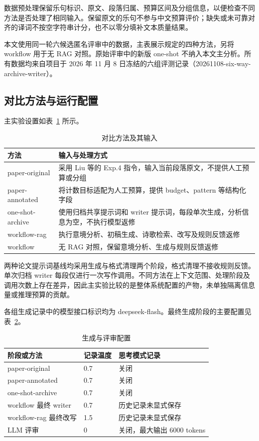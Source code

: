 \documentclass[12pt, a4paper]{ctexart}
\numberwithin{table}{section}
\numberwithin{figure}{section}
\begin{document}
数据预处理保留乐句标识、原文、段落归属、预算区间及分组信息，以便检查不同方法是否处理了相同输入。保留原文的乐句不参与中文预算评价；缺失或未可靠对齐的译词不按空字符串计分，也不以零分填补文本质量结果。

本文使用同一轮六候选匿名评审中的数据，主表展示规定的四种方法，另将 workflow 用于无 RAG 对照。原始评审中的新版 one-shot 不纳入本文主分析。所有数据均来自项目于 2026 年 11 月 8 日冻结的六组评测记录（20261108-six-way-archive-writer）。

\subsection{对比方法与运行配置}
主实验设置如表~\ref{tab:methods} 所示。

\begin{table}[htbp]
  \centering
  \caption{对比方法及其输入}
  \label{tab:methods}
  \begin{tabular}{p{}p{}}
    \toprule
    方法 & 输入与处理方式 \\
    \midrule
    paper-original   & 采用 Liu 等的 Exp.4 指令，输入当前段落原文，不提供人工预算或分组 \\
    paper-annotated  & 将计数目标适配为人工预算，提供 budget、pattern 等结构化字段 \\
    one-shot-archive & 使用归档共享提示词和 writer 提示词，每段单次生成，分析信息为空，不执行模型返修 \\
    workflow-rag     & 执行意境分析、初稿生成、诗歌检索、改写及规则反馈返修 \\
    workflow         & 无 RAG 对照，保留意境分析、生成与规则反馈返修 \\
    \bottomrule
  \end{tabular}
\end{table}

两种论文提示词基线均采用生成与格式清理两个阶段，格式清理不接收规则反馈。单次归档 writer 每段仅进行一次写作调用。不同方法在上下文范围、处理阶段及调用次数上存在差异，因此主实验比较的是整体系统配置的产物，未单独隔离信息量或推理预算的贡献。

各组生成记录中的模型接口标识均为 deepseek-flash。最终生成阶段的主要配置见表~\ref{tab:config}。

\begin{table}[htbp]
  \centering
  \caption{生成与评审配置}
  \label{tab:config}
  \begin{tabular}{lll}
    \toprule
    阶段或方法 & 记录温度 & 思考模式记录 \\
    \midrule
    paper-original        & 0.7 & 关闭 \\
    paper-annotated       & 0.7 & 关闭 \\
    one-shot-archive      & 0.7 & 关闭 \\
    workflow 最终 writer  & 0.7 & 历史记录未显式保存 \\
    workflow-rag 最终改写 & 1.5 & 历史记录未显式保存 \\
    LLM 评审              & 0   & 关闭，最大输出 6000 tokens \\
    \bottomrule
  \end{tabular}
\end{table}
\end{document}
